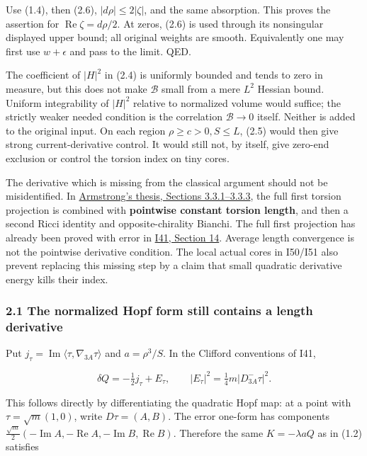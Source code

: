 \documentclass[
  11pt,
]{article}
\begin{document}
Use (1.4), then (2.6), \(|d\rho|\le2|\zeta|\), and the same absorption.
This proves the assertion for \(\operatorname{Re}\zeta=d\rho/2\). At
zeros, (2.6) is used through its nonsingular displayed upper bound; all
original weights are smooth. Equivalently one may first use
\(w+\epsilon\) and pass to the limit. QED.

The coefficient of \(|H|^2\) in (2.4) is uniformly bounded and tends to
zero in measure, but this does not make \(\mathcal B\) small from a mere
\(L^2\) Hessian bound. Uniform integrability of \(|H|^2\) relative to
normalized volume would suffice; the strictly weaker needed condition is
the correlation \(\mathcal B\to0\) itself. Neither is added to the
original input. On each region \(\rho\ge c>0,S\le L\), (2.5) would then
give strong current-derivative control. It would still not, by itself,
give zero-end exclusion or control the torsion index on tiny cores.

The derivative which is missing from the classical argument should not
be misidentified. In
\href{https://johnarmstrongmaths.com/publications/resources/thesis.pdf}{Armstrong's
thesis, Sections 3.3.1--3.3.3}, the full first torsion projection is
combined with \textbf{pointwise constant torsion length}, and then a
second Ricci identity and opposite-chirality Bianchi. The full first
projection has already been proved with error in
\href{20260927_conformal_separation_and_zero_end.md}{I41, Section 14}.
Average length convergence is not the pointwise derivative condition.
The local actual cores in I50/I51 also prevent replacing this missing
step by a claim that small quadratic derivative energy kills their
index.

\hypertarget{the-normalized-hopf-form-still-contains-a-length-derivative}{%
\subsubsection{2.1 The normalized Hopf form still contains a length
derivative}\label{the-normalized-hopf-form-still-contains-a-length-derivative}}

Put \(j_\tau=\operatorname{Im}\langle\tau,\nabla_{3A}\tau\rangle\) and
\(a=\rho^3/S\). In the Clifford conventions of I41,

\[
 \delta Q=-\tfrac12 j_\tau+E_\tau,\qquad
 |E_\tau|^2=\tfrac14 m|D^-_{3A}\tau|^2.
 \tag{2.8}
\]

This follows directly by differentiating the quadratic Hopf map: at a
point with \(\tau=\sqrt m(1,0)\), write \(D\tau=(A,B)\). The error
one-form has components
\(\frac{\sqrt m}{2}(-\operatorname{Im}A,-\operatorname{Re}A, -\operatorname{Im}B,\operatorname{Re}B)\).
Therefore the same \(K=-\lambda aQ\) as in (1.2) satisfies
\end{document}
